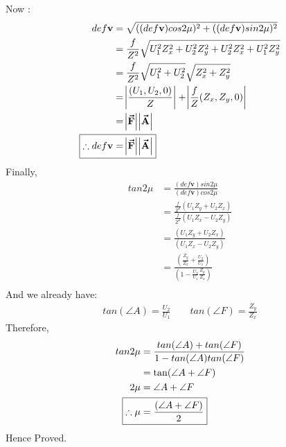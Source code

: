 \documentclass{article}
\newcommand{\boldvec}[1]{\boldsymbol{\vec{\textbf{#1}}}}
\begin{document}
Now :
\begin{align*}
  def\mathbf{v} &= \sqrt{((def\mathbf{v})cos2\mu)^2 + ((def\mathbf{v})sin2\mu)^2}\\
                &= \frac{f}{Z^2}\sqrt{ U_1^2Z_x^2 + U_2^2Z_y^2 + U_2^2Z_x^2 + U_1^2Z_y^2 }\\
                &= \frac{f}{Z^2}\sqrt{U_1^2 + U_2^2}\sqrt{Z_x^2 + Z_y^2}\\
                &= \abs{\frac{(U_1,U_2,0)}{Z}} + \abs{\frac{f}{Z}(Z_x,Z_y,0)}\\
                &= \abs{\boldvec{F}}\abs{\boldvec{A}} \\
  \Aboxed{\therefore def\mathbf{v} &= \abs{\boldvec{F}}\abs{\boldvec{A}} }
\end{align*}
Finally,
\begin{align*}
tan2\mu &= \frac{(def\mathbf{v})sin2\mu}{(def\mathbf{v})cos2\mu}\\
        &= \frac{\frac{f}{Z^2}(U_1Z_y + U_2Z_x)}{\frac{f}{Z^2}(U_1Z_x - U_2Z_y)}\\
        &= \frac{(U_1Z_y + U_2Z_x)}{(U_1Z_x - U_2Z_y)}\\
        &= \frac{(\frac{Z_y}{Z_x} + \frac{U_2}{U_1})}{(1 - \frac{U_2}{U_1}\frac{Z_y}{Z_x})}\\
\end{align*}
And we already have:
\begin{align*}
  tan(\angle A) = \frac{U_2}{U_1} \qquad tan(\angle F) = \frac{Z_y}{Z_x}
\end{align*}
Therefore,
\begin{align*}
  tan2\mu &= \frac{tan(\angle A)+tan(\angle F)}{1 - tan(\angle A)tan(\angle F)}\\
          &= \tan(\angle A + \angle F)\\
  2\mu &= \angle A + \angle F \\
  \Aboxed{\therefore \mu &= \frac{(\angle A + \angle F)}{2}}
\end{align*}
Hence Proved.
\end{document}
